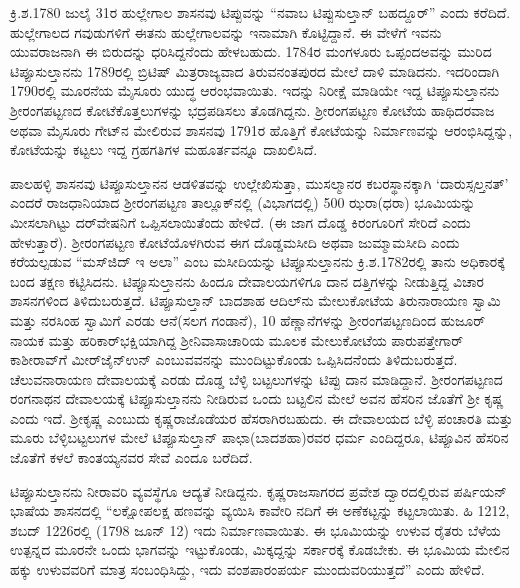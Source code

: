 ಕ್ರಿ.ಶ.1780 ಜುಲೈ 31ರ ಹುಲ್ಲೇಗಾಲ ಶಾಸನವು ಟಿಪ್ಪುವನ್ನು “ನವಾಬ ಟಿಪ್ಪುಸುಲ್ತಾನ್​ ಬಹದ್ದೂರ್​” ಎಂದು ಕರೆದಿದೆ. ಹುಲ್ಲೇಗಾಲದ ಗವುಡುಗಳಿಗೆ ಈತನು ಹುಲ್ಲೇಗಾಲವನ್ನು ಇನಾಮಾಗಿ ಕೊಟ್ಟಿದ್ದಾನೆ. ಈ ವೇಳೆಗೆ ಇವನು ಯುವರಾಜನಾಗಿ ಈ ಬಿರುದನ್ನು ಧರಿಸಿದ್ದನೆಂದು ಹೇಳಬಹುದು. 1784ರ ಮಂಗಳೂರು ಒಪ್ಪಂದಅವನ್ನು ಮುರಿದ ಟಿಪ್ಪೂಸುಲ್ತಾನನು 1789ರಲ್ಲಿ ಬ್ರಿಟಿಷ್​ ಮಿತ್ರರಾಜ್ಯವಾದ ತಿರುವನಂತಪುರದ ಮೇಲೆ ದಾಳಿ ಮಾಡಿದನು. ಇದರಿಂದಾಗಿ 1790ರಲ್ಲಿ ಮೂರನೆಯ ಮೈಸೂರು ಯುದ್ಧ ಆರಂಭವಾಯಿತು. ಇದನ್ನು ನಿರೀಕ್ಷೆ ಮಾಡಿಯೇ ಇದ್ದ ಟಿಪ್ಪೂಸುಲ್ತಾನನು ಶ‍್ರೀರಂಗಪಟ್ಟಣದ ಕೋಟೆಕೊತ್ತಲುಗಳನ್ನು ಭದ್ರಪಡಿಸಲು ತೊಡಗಿದ್ದನು. ಶ‍್ರೀರಂಗಪಟ್ಟಣ ಕೋಟೆಯ ಹಾಥಿದರವಾಜ ಅಥವಾ ಮೈಸೂರು ಗೇಟ್​ನ ಮೇಲಿರುವ ಶಾಸನವು 1791ರ ಹೊತ್ತಿಗೆ ಕೋಟೆಯನ್ನು ನಿರ್ಮಾಣವನ್ನು ಆರಂಭಿಸಿದ್ದನ್ನು, ಕೋಟೆಯನ್ನು ಕಟ್ಟಲು ಇದ್ದ ಗ್ರಹಗತಿಗಳ ಮಹೂರ್ತವನ್ನೂ ದಾಖಲಿಸಿದೆ.

ಪಾಲಹಳ್ಳಿ ಶಾಸನವು ಟಿಪ್ಪೂಸುಲ್ತಾನನ ಆಡಳಿತವನ್ನು ಉಲ್ಲೇಖಿಸುತ್ತಾ, ಮುಸಲ್ಮಾನರ ಕಬರಸ್ಥಾನಕ್ಕಾಗಿ ‘ದಾರುಸ್ಸಲ್ತನತ್​’ ಎಂದರೆ ರಾಜಧಾನಿಯಾದ ಶ‍್ರೀರಂಗಪಟ್ಟಣ ತಾಲ್ಲೂಕ್​ನಲ್ಲಿ (ವಿಭಾಗದಲ್ಲಿ) 500 ಝರಾ(ಧರಾ) ಭೂಮಿಯನ್ನು ಮೀಸಲಾಗಿಟ್ಟು ದರ್​ವೇಷನಿಗೆ ಒಪ್ಪಿಸಲಾಯಿತೆಂದು ಹೇಳಿದೆ. (ಈ ಜಾಗ ದೊಡ್ಡ ಕಿರಂಗೂರಿಗೆ ಸೇರಿದೆ ಎಂದು ಹೇಳುತ್ತಾರೆ). ಶ‍್ರೀರಂಗಪಟ್ಟಣ ಕೋಟೆಯೊಳಗಿರುವ ಈಗ ದೊಡ್ಡಮಸೀದಿ ಅಥವಾ ಜುಮ್ಮಾಮಸೀದಿ ಎಂದು ಕರೆಯಲ್ಪಡುವ “ಮಸ್​ಜಿದ್​ ಇ ಅಲಾ” ಎಂಬ ಮಸೀದಿಯನ್ನು ಟಿಪ್ಪೂಸುಲ್ತಾನನು ಕ್ರಿ.ಶ.1782ರಲ್ಲಿ ತಾನು ಅಧಿಕಾರಕ್ಕೆ ಬಂದ ತಕ್ಷಣ ಕಟ್ಟಿಸಿದನು. ಟಿಪ್ಪೂಸುಲ್ತಾನನು ಹಿಂದೂ ದೇವಾಲಯಗಳಿಗೂ ದಾನ ದತ್ತಿಗಳನ್ನು ನೀಡುತ್ತಿದ್ದ ವಿಚಾರ ಶಾಸನಗಳಿಂದ ತಿಳಿದುಬರುತ್ತದೆ. ಟಿಪ್ಪೂಸುಲ್ತಾನ್​ ಬಾದಶಾಹ ಆದಿಲ್​ನು ಮೇಲುಕೋಟೆಯ ತಿರುನಾರಾಯಣ ಸ್ವಾಮಿ ಮತ್ತು ನರಸಿಂಹ ಸ್ವಾಮಿಗೆ ಎರಡು ಆನೆ(ಸಲಗ ಗಂಡಾನೆ), 10 ಹೆಣ್ಣಾನೆಗಳನ್ನು ಶ‍್ರೀರಂಗಪಟ್ಟಣದಿಂದ ಹುಜೂರ್​ನಾಯಕ ಮತ್ತು ಹರಿಕಾರ್​ಭಕ್ಷಿಯಾಗಿದ್ದ ಶ‍್ರೀನಿವಾಸಾಚಾರಿಯ ಮೂಲಕ ಮೇಲುಕೋಟೆಯ ಪಾರುಪತ್ತೇಗಾರ್​ ಕಾಶೀರಾವ್​ಗೆ ಮೀರ್​ಜೈನ್​ಉನ್​ ಎಂಬುವವನನ್ನು ಮುಂದಿಟ್ಟುಕೊಂಡು ಒಪ್ಪಿಸಿದನೆಂದು ತಿಳಿದುಬರುತ್ತದೆ. ಚೆಲುವನಾರಾಯಣ ದೇವಾಲಯಕ್ಕೆ ಎರಡು ದೊಡ್ಡ ಬೆಳ್ಳಿ ಬಟ್ಟಲುಗಳನ್ನು ಟಿಪ್ಪು ದಾನ ಮಾಡಿದ್ದಾನೆ. ಶ‍್ರೀರಂಗಪಟ್ಟಣದ ರಂಗನಾಥನ ದೇವಾಲಯಕ್ಕೆ ಟಿಪ್ಪೂಸುಲ್ತಾನನು ನೀಡಿರುವ ಒಂದು ಬಟ್ಟಲಿನ ಮೇಲೆ ಅವನ ಹೆಸರಿನ ಜೊತೆಗೆ ಶ‍್ರೀ ಕೃಷ್ಣ ಎಂದು ಇದೆ. ಶ‍್ರೀಕೃಷ್ಣ ಎಂಬುದು ಕೃಷ್ಣರಾಜೊಡೆಯರ ಹೆಸರಾಗಿರಬಹುದು. ಈ ದೇವಾಲಯದ ಬೆಳ್ಳಿ ಪಂಚಾರತಿ ಮತ್ತು ಮೂರು ಬೆಳ್ಳಿಬಟ್ಟಲುಗಳ ಮೇಲೆ ಟಿಪ್ಪೂಸುಲ್ತಾನ್​ ಪಾಛಾ(ಬಾದಶಹಾ)ರವರ ಧರ್ಮ ಎಂದಿದ್ದರೂ, ಟಿಪ್ಪೂವಿನ ಹೆಸರಿನ ಜೊತೆಗೆ ಕಳಲೆ ಕಾಂತಯ್ಯನವರ ಸೇವೆ ಎಂದೂ ಬರೆದಿದೆ.

ಟಿಪ್ಪೂಸುಲ್ತಾನನು ನೀರಾವರಿ ವ್ಯವಸ್ಥೆಗೂ ಆದ್ಯತೆ ನೀಡಿದ್ದನು. ಕೃಷ್ಣರಾಜಸಾಗರದ ಪ್ರವೇಶ ದ್ವಾರದಲ್ಲಿರುವ ಪರ್ಷಿಯನ್​ ಭಾಷೆಯ ಶಾಸನದಲ್ಲಿ “ಲಕ್ಷೋಪಲಕ್ಷ ಹಣವನ್ನು ವ್ಯಯಿಸಿ ಕಾವೇರಿ ನದಿಗೆ ಈ ಅಣೆಕಟ್ಟನ್ನು ಕಟ್ಟಲಾಯಿತು. ಹಿ 1212, ಶಬದ್​ 1226ರಲ್ಲಿ (1798 ಜೂನ್​ 12) ಇದು ನಿರ್ಮಾಣವಾಯಿತು. ಈ ಭೂಮಿಯನ್ನು ಉಳುವ ರೈತರು ಬೆಳೆಯ ಉತ್ಪನ್ನದ ಮೂರನೇ ಒಂದು ಭಾಗವನ್ನು ಇಟ್ಟುಕೊಂಡು, ಮಿಕ್ಕದ್ದನ್ನು ಸರ್ಕಾರಕ್ಕೆ ಕೊಡಬೇಕು. ಈ ಭೂಮಿಯ ಮೇಲಿನ ಹಕ್ಕು ಉಳುವವರಿಗೆ ಮಾತ್ರ ಸಂಬಂಧಿಸಿದ್ದು, ಇದು ವಂಶಪಾರಂಪರ್ಯ ಮುಂದುವರಿಯುತ್ತದೆ” ಎಂದು ಹೇಳಿದೆ.

